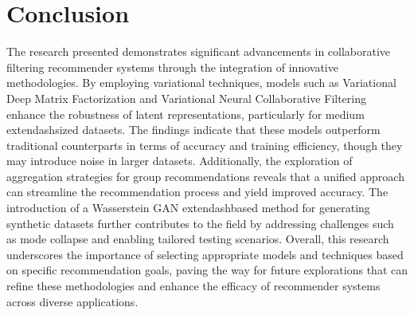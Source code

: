 \documentclass[runningheads]{llncs}
\begin{document}
\section{Conclusion}
The research presented demonstrates significant advancements in collaborative filtering recommender systems through the integration of innovative methodologies. By employing variational techniques, models such as Variational Deep Matrix Factorization and Variational Neural Collaborative Filtering enhance the robustness of latent representations, particularly for medium	extendash{}sized datasets. The findings indicate that these models outperform traditional counterparts in terms of accuracy and training efficiency, though they may introduce noise in larger datasets. Additionally, the exploration of aggregation strategies for group recommendations reveals that a unified approach can streamline the recommendation process and yield improved accuracy. The introduction of a Wasserstein GAN	extendash{}based method for generating synthetic datasets further contributes to the field by addressing challenges such as mode collapse and enabling tailored testing scenarios. Overall, this research underscores the importance of selecting appropriate models and techniques based on specific recommendation goals, paving the way for future explorations that can refine these methodologies and enhance the efficacy of recommender systems across diverse applications.
\end{document}
